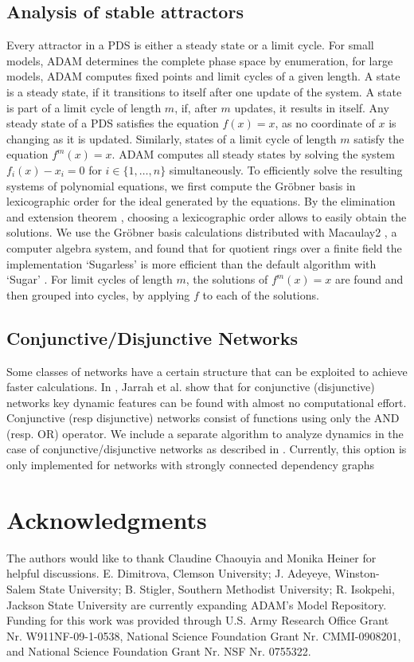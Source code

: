 \documentclass[11pt]{amsart}
\begin{document}
\subsection{Analysis of stable attractors}
Every attractor in a PDS is either a
steady state or a limit cycle. For small models, ADAM determines the complete
phase space by enumeration, for large models, ADAM computes fixed points and
limit cycles of a given length.
A state is a steady state, if it transitions to itself after one update of the
system. A state is part of a limit cycle of length $m$, if,
after $m$ updates, it results in itself. Any steady state of a PDS satisfies
the equation $f(x) = x$, as no coordinate of $x$ is changing as it is updated.
Similarly, states of a
limit cycle of length $m$ satisfy the equation $f^m(x) = x$. ADAM computes all
steady states by solving the system $f_i(x) - x_i = 0$ for $i \in \{1, \ldots,
n\}$ simultaneously. To efficiently solve the resulting systems of polynomial
equations, we first compute the Gr\"obner
basis in lexicographic order for the ideal generated by the equations.
By the elimination and extension theorem \cite{IVA}, choosing a lexicographic order
allows to easily obtain the solutions.
We use the Gr\"obner basis calculations distributed with Macaulay2 \cite{M2}, a
computer algebra system, and found that for quotient rings over a finite field
the implementation `Sugarless' is more efficient than the default algorithm
with `Sugar' \cite{Sugar:1991}.
For limit cycles of length $m$, the solutions of $f^m(x)=x$ are found and then
grouped into cycles, by applying $f$ to each of the solutions.
\subsection{Conjunctive/Disjunctive Networks} \label{sec:conj}
Some classes of networks have a certain structure that can be
exploited to achieve faster calculations. In \cite{conjunctive}, Jarrah et al.
show that for conjunctive (disjunctive) networks key dynamic features can be found with
almost no computational effort. Conjunctive (resp disjunctive) networks consist of
functions using only the AND (resp. OR) operator.
We include a separate algorithm to analyze
dynamics in the case of conjunctive/disjunctive networks as described in
\cite{conjunctive}. Currently,
this option is only implemented for networks with strongly connected dependency graphs
\section*{Acknowledgments}
The authors would like to thank Claudine Chaouyia and Monika Heiner for helpful discussions. E. Dimitrova, Clemson University; J. Adeyeye, Winston-Salem State University; B. Stigler, Southern Methodist University; R. Isokpehi, Jackson State University are currently expanding ADAM’s Model Repository.
Funding for this work was provided through U.S. Army Research Office Grant Nr. W911NF-09-1-0538,
National Science Foundation Grant Nr. CMMI-0908201, and National Science Foundation Grant Nr. NSF Nr. 0755322.
 
 

%

\end{document}
